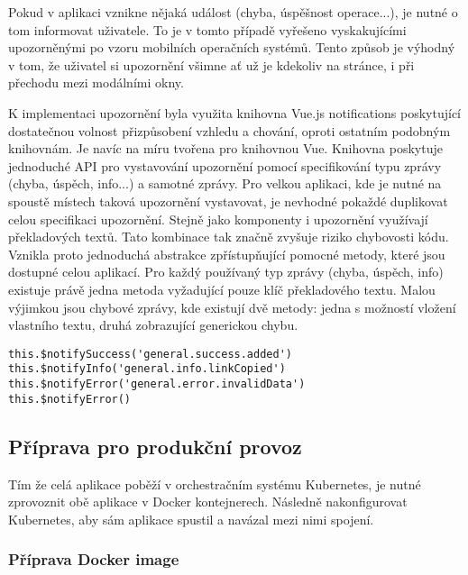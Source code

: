 		Pokud v aplikaci vznikne nějaká událost (chyba, úspěšnost operace...), je nutné o tom informovat uživatele.
		To je v tomto případě vyřešeno vyskakujícími upozorněnými po vzoru mobilních operačních
		systémů.
		Tento způsob je výhodný v tom, že uživatel si upozornění všimne ať už je kdekoliv na stránce, i
		při přechodu mezi modálními okny.


		K implementaci upozornění byla využita knihovna Vue.js notifications
		poskytující dostatečnou volnost přizpůsobení vzhledu a chování, oproti ostatním podobným knihovnám.
		Je navíc na míru tvořena pro knihovnou Vue.
		Knihovna poskytuje jednoduché \ac{API} pro vystavování upozornění pomocí specifikování typu zprávy (chyba, úspěch, info...) a
		samotné zprávy.
		Pro velkou aplikaci, kde je nutné na spoustě místech taková upozornění vystavovat, je nevhodné pokaždé duplikovat
		celou specifikaci upozornění.
		Stejně jako komponenty i upozornění využívají překladových textů.
		Tato kombinace tak značně zvyšuje riziko chybovosti kódu.
		Vznikla proto jednoduchá abstrakce zpřístupňující pomocné metody, které jsou dostupné celou aplikací.
		Pro každý používaný typ zprávy (chyba, úspěch, info) existuje právě jedna metoda vyžadující pouze klíč překladového textu.
		Malou výjimkou jsou chybové zprávy, kde existují dvě metody: jedna s možností vložení vlastního textu, druhá
		zobrazující generickou chybu.

		\begin{lstlisting}[caption={Implementované pomocné metody pro vystavení různých typů upozornění. Zdroj: [autor]}]
this.$notifySuccess('general.success.added')
this.$notifyInfo('general.info.linkCopied')
this.$notifyError('general.error.invalidData')
this.$notifyError()
		\end{lstlisting}

	\subsection{Příprava pro produkční provoz}

	Tím že celá aplikace poběží v orchestračním systému Kubernetes, je nutné zprovoznit obě aplikace v Docker kontejnerech.
	Následně nakonfigurovat Kubernetes, aby sám aplikace spustil a navázal mezi nimi spojení.

		\subsubsection{Příprava Docker image}

